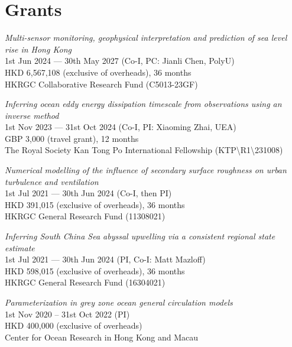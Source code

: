 \documentclass[letterpaper]{article}
\renewenvironment{itemize}{
  \begin{list}{}{
    \setlength{\leftmargin}{1.5em}
  }
}{
  \end{list}
}
\begin{document}
\section*{Grants}

\begin{itemize}

\item[--] \textit{Multi-sensor monitoring, geophysical interpretation and prediction of sea level rise in Hong Kong}\\
1st Jun 2024 --- 30th May 2027 (Co-I, PC: Jianli Chen, PolyU)\\
HKD 6,567,108 (exclusive of overheads), 36 months\\
HKRGC Collaborative Research Fund (C5013-23GF)

\item[--] \textit{Inferring ocean eddy energy dissipation timescale from observations using an inverse method}\\
1st Nov 2023 --- 31st Oct 2024 (Co-I, PI: Xiaoming Zhai, UEA)\\
GBP 3,000 (travel grant), 12 months\\
The Royal Society Kan Tong Po International Fellowship (KTP\textbackslash R1\textbackslash 231008)

\item[--] \textit{Numerical modelling of the influence of secondary surface roughness on urban turbulence and ventilation}\\
1st Jul 2021 --- 30th Jun 2024 (Co-I, then PI)\\
HKD 391,015 (exclusive of overheads), 36 months\\
HKRGC General Research Fund (11308021)

\item[--] \textit{Inferring South China Sea abyssal upwelling via a consistent regional state estimate}\\
1st Jul 2021 --- 30th Jun 2024 (PI, Co-I: Matt Mazloff)\\
HKD 598,015 (exclusive of overheads), 36 months\\
HKRGC General Research Fund (16304021)

\item[--] \textit{Parameterization in grey zone ocean general circulation models}\\
1st Nov 2020 -- 31st Oct 2022 (PI)\\
HKD 400,000 (exclusive of overheads)\\
Center for Ocean Research in Hong Kong and Macau


\end{itemize}
\end{document}
